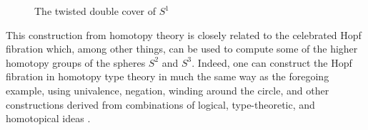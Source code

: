 \documentclass[11pt]{article}
\theoremstyle{remark}
\theoremstyle{definition}
\begin{document}
\begin{figure}\centering
  \caption{The twisted double cover of $S^1$}\label{fig:winding}
\end{figure}
%
This construction from homotopy theory is closely related to the celebrated Hopf fibration which, among other things, can be used to compute some of the higher homotopy groups of the spheres $S^2$ and $S^3$.  Indeed, one can construct the Hopf fibration in homotopy type theory in much the same way as the foregoing example, using univalence, negation, winding around the circle, and other constructions derived from combinations of logical, type-theoretic, and homotopical ideas \cite{Hopf}. 

\end{document}
